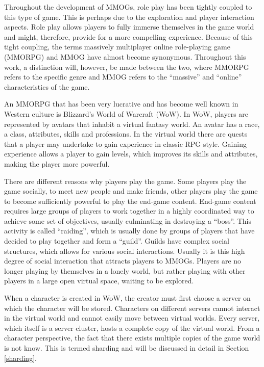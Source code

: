 Throughout the development of MMOGs, role play has been tightly coupled to this type of game. This is perhaps due to the exploration and player interaction aspects. Role play allows players to fully immerse themselves in the game world and might, therefore, provide for a more compelling experience. Because of this tight coupling, the terms massively multiplayer online role-playing game (MMORPG) and MMOG have almost become synonymous. Throughout this work, a distinction will, however, be made between the two, where MMORPG refers to the specific genre and MMOG refers to the ``massive'' and ``online'' characteristics of the game.

An MMORPG that has been very lucrative and has become well known in Western culture is Blizzard's World of Warcraft (WoW). In WoW, players are represented by avatars that inhabit a virtual fantasy world. An avatar has a race, a class, attributes, skills and professions. In the virtual world there are quests that a player may undertake to gain experience in classic RPG style. Gaining experience allows a player to gain levels, which improves its skills and attributes, making the player more powerful.

There are different reasons why players play the game. Some players play the game socially, to meet new people and make friends, other players play the game to become sufficiently powerful to play the end-game content. End-game content requires large groups of players to work together in a highly coordinated way to achieve some set of objectives, usually culminating in destroying a ``boss''. This activity is called ``raiding'', which is usually done by groups of players that have decided to play together and form a ``guild''. Guilds have complex social structures, which allows for various social interactions. Usually it is this high degree of social interaction that attracts players to MMOGs. Players are no longer playing by themselves in a lonely world, but rather playing with other players in a large open virtual space, waiting to be explored.

When a character is created in WoW, the creator must first choose a server on which the character will be stored. Characters on different servers cannot interact in the virtual world and cannot easily move between virtual worlds. Every server, which itself is a server cluster, hosts a complete copy of the virtual world. From a character perspective, the fact that there exists multiple copies of the game world is not know. This is termed sharding and will be discussed in detail in Section \ref{sharding}.


